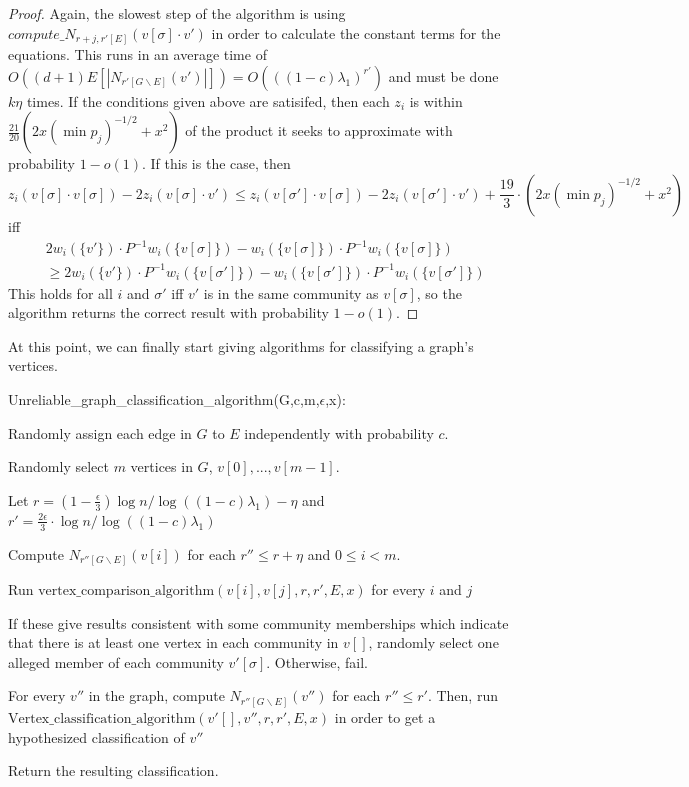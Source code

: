 \documentclass[11pt]{article}
\newcommand{\1}{\mathbb{1}}
\begin{document}
\begin{proof}
Again, the slowest step of the algorithm is using $compute\_N_{r+j,r'[E]}(v[\sigma]\cdot v')$ in order to calculate the constant terms for the equations. This runs in an average time of  $O((d+1)E[|N_{r'[G\backslash E]}(v')|])= O(((1-c)\lambda_1)^{r'})$ and must be done $k\eta$ times. If the conditions given above are satisifed, then each $z_i$ is within  $\frac{21}{20}(2x(\min p_j)^{-1/2}+x^2)$ of the product it seeks to approximate with probability $1-o(1)$. If this is the case, then \[z_i(v[\sigma]\cdot v[\sigma])-2z_i(v[\sigma]\cdot v')\le z_i(v[\sigma']\cdot v[\sigma])-2z_i(v[\sigma']\cdot v') +\frac{19}{3}\cdot (2x(\min p_j)^{-1/2}+x^2)\]
 iff 
\begin{align*}
&2w_i(\{v'\})\cdot P^{-1}w_i(\{v[\sigma]\})-w_i(\{v[\sigma]\})\cdot P^{-1}w_i(\{v[\sigma]\})\\
&\ge 2w_i(\{v'\})\cdot P^{-1}w_i(\{v[\sigma']\})-w_i(\{v[\sigma']\})\cdot P^{-1}w_i(\{v[\sigma']\})
\end{align*}
 This holds for all $i$ and $\sigma'$ iff $v'$ is in the same community as $v[\sigma]$, so the algorithm returns the correct result with probability $1-o(1)$.
\end{proof}

At this point, we can finally start giving algorithms for classifying a graph's vertices.
\begin{algorithm}
Unreliable\_graph\_classification\_algorithm(G,c,m,$\epsilon$,x):

\phantom{xxx} Randomly assign each edge in $G$ to $E$ independently with probability $c$.

\phantom{xxx} Randomly select $m$ vertices in $G$, $v[0],...,v[m-1]$.

\phantom{xxx} Let $r=(1-\frac{\epsilon}{3})\log n/\log ((1-c)\lambda_1)-\eta$ and $r'=\frac{2\epsilon}{3}\cdot \log n/\log ((1-c)\lambda_1)$

\phantom{xxx} Compute $N_{r''[G\backslash E]}(v[i])$ for each $r''\le r+\eta$ and $0\le i<m$.

\phantom{xxx} Run $\text{vertex\_comparison\_algorithm}(v[i],v[j],r,r',E,x)$ for every $i$ and $j$

\phantom{xxx} If these give results consistent with some community memberships which indicate that there is at least one vertex in each community in $v[]$, randomly select one alleged member of each community $v'[\sigma]$. Otherwise, fail.

\phantom{xxx} For every $v''$ in the graph, compute $N_{r''[G\backslash E]}(v'')$ for each $r''\le r'$. Then, run\newline $\text{Vertex\_classification\_algorithm}(v'[],v'', r,r',E,x)$ in order to get a hypothesized classification of $v''$

\phantom{xxx} Return the resulting classification.
\end{algorithm}
\end{document}
